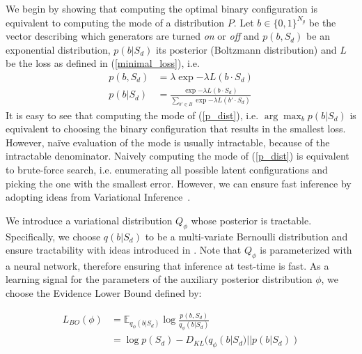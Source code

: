 We begin by showing that computing the optimal binary configuration is equivalent to computing the mode of a distribution $P$. Let $b\in\{0,1\}^{N_g}$ be the vector describing which generators are turned \emph{on} or \emph{off} and $p(b,S_d)$ be an exponential distribution, $p(b|S_d)$ its posterior (Boltzmann distribution) and $L$ be the loss as defined in (\ref{minimal_loss}), i.e. 
\begin{align}
p(b, S_d) &= \lambda \exp{- \lambda L(b\cdot S_d)}\\
p(b|S_d) &= \frac {\exp{- \lambda L(b\cdot S_d)}}{\sum _{b' \in B}{\exp{- \lambda L(b'\cdot S_d)}}} \label{p_dist}
\end{align}
It is easy to see that computing the mode of (\ref{p_dist}), i.e. $\arg\max_b p(b|S_d)$ is equivalent to choosing the binary configuration that results in the smallest loss. However, na\"ive evaluation of the mode is usually intractable, because of the intractable denominator. Naively computing the mode of (\ref{p_dist}) is equivalent to brute-force search, i.e. enumerating all possible latent configurations and picking the one with the smallest error. However, we can ensure fast inference by adopting ideas from Variational Inference~\cite{wainwright2008graphical}.

We introduce a variational distribution $Q_\phi$ whose posterior is tractable. Specifically, we choose $q(b|S_d)$ to be a multi-variate Bernoulli distribution and ensure tractability with ideas introduced in \cite{lange2018factornet}. Note that $Q_\phi$ is parameterized with a neural network, therefore ensuring that inference at test-time is fast. As a learning signal for the parameters of the auxiliary posterior distribution $\phi$, we choose the Evidence Lower Bound defined by:

\begin{align}
L_{BO}(\phi) &= \mathbb{E}_{q_\phi(b|S_d)} \log \frac{p(b,S_d)}{q_\phi(b|S_d)} \label{elbo}\\
&= \log p(S_d) - D_{KL}(q_\phi(b|S_d) || p(b|S_d))
\end{align}

